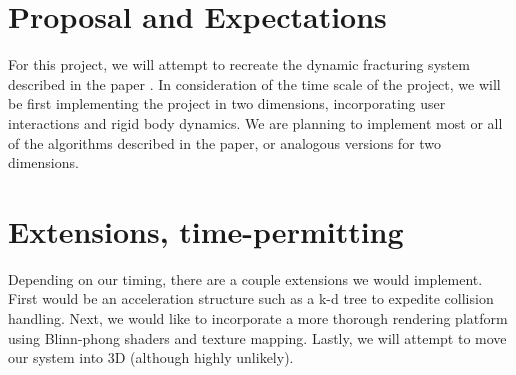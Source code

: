 \documentclass[tog]{acmsiggraph}
\begin{document}
\section{Proposal and Expectations}

For this project, we will attempt to recreate the dynamic fracturing
system described in the paper \cite{Mul13}. In consideration of the
time scale of the project, we will be first implementing the project
in two dimensions, incorporating user interactions and rigid body
dynamics. We are planning to implement most or all of the algorithms
described in the paper, or analogous versions for two dimensions.

\section{Extensions, time-permitting}

Depending on our timing, there are a couple extensions we would implement. First
would be an acceleration structure such as a k-d tree to expedite collision handling.
Next, we would like to incorporate a more thorough rendering platform using Blinn-phong
shaders and texture mapping. Lastly, we will attempt to move our system into 3D (although
highly unlikely).




\end{document}
